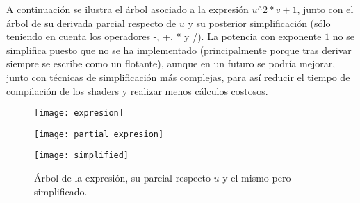 A continuación se ilustra el árbol asociado a la expresión  $u^\wedge 2 * v + 1$, junto con el árbol de su derivada parcial respecto de $u$ y su posterior simplificación (sólo teniendo en cuenta los operadores -, +, * y /). La potencia con exponente $1$ no se simplifica puesto que no se ha implementado (principalmente porque tras derivar siempre se escribe como un flotante), aunque en un futuro se podría mejorar, junto con técnicas de simplificación más complejas, para así reducir el tiempo de compilación de los shaders y realizar menos cálculos costosos.

\begin{figure}[h]
		\begin{minipage}{0.35\textwidth}
  			\centering
		  	\texttt{[image: expresion]}
		\end{minipage}\hfill
		\begin{minipage}{0.4\textwidth}
  			\centering
		  	\texttt{[image: partial\_expresion]}
		\end{minipage}\hfill
		\begin{minipage}{0.23\textwidth}
  			\centering
		  	\texttt{[image: simplified]}
		\end{minipage}\hfill
	\caption{Árbol de la expresión, su parcial respecto $u$ y el mismo pero simplificado.}
  	\label{fig:arbol_expresion}
\end{figure}

